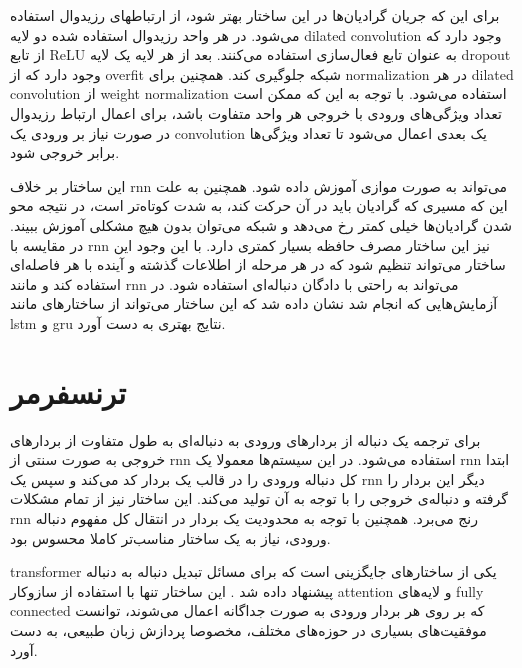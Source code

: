 برای این که جریان گرادیان‌ها در این ساختار بهتر شود، از ارتباطهای رزیدوال
استفاده می‌شود. در هر واحد رزیدوال استفاده شده دو لایه \gls{dilated convolution}
وجود دارد که از تابع ReLU به عنوان تابع فعال‌سازی استفاده می‌کنند. بعد از هر
لایه یک لایه dropout وجود دارد که از \gls{overfit} شبکه جلوگیری کند. همچنین برای
\gls{normalization} در هر \gls{dilated convolution} از \gls{weight
normalization} استفاده می‌شود. با توجه به این که ممکن است تعداد ویژگی‌های ورودی
با خروجی هر واحد متفاوت باشد، برای اعمال ارتباط رزیدوال در صورت نیاز بر ورودی یک
\gls{convolution} یک بعدی اعمال می‌شود تا تعداد ویژگی‌ها برابر خروجی شود.

این ساختار بر خلاف \gls{rnn} می‌تواند به صورت موازی آموزش داده شود. همچنین به
علت این که مسیری که گرادیان باید در آن حرکت کند، به شدت کوتاه‌تر است، در نتیجه
محو شدن گرادیان‌ها خیلی کمتر رخ می‌دهد و شبکه می‌توان بدون هیچ مشکلی آموزش
ببیند. در مقایسه با \gls{rnn} نیز این ساختار مصرف حافظه بسیار کمتری دارد. با این
وجود این ساختار می‌تواند تنظیم شود که در هر مرحله از اطلاعات گذشته و آینده با هر
فاصله‌ای استفاده کند و مانند \gls{rnn} می‌تواند به راحتی با دادگان دنباله‌ای
استفاده شود. در آزمایش‌هایی که انجام شد \cite{bai2018empirical} نشان داده شد که
این ساختار می‌تواند از ساختارهای مانند \gls{lstm} و \gls{gru} نتایج بهتری به دست
آورد.

\section{ترنسفرمر}
برای ترجمه یک دنباله از بردارهای ورودی به دنباله‌ای به طول متفاوت از بردارهای
خروجی به صورت سنتی از \gls{rnn} استفاده می‌شود. در این سیستم‌ها معمولا یک
\gls{rnn} ابتدا کل دنباله ورودی را در قالب یک بردار کد می‌کند و سپس یک \gls{rnn}
دیگر این بردار را گرفته و دنباله‌ی خروجی را با توجه به آن تولید می‌کند. این
ساختار نیز از تمام مشکلات \gls{rnn} رنج می‌برد. همچنین با توجه به محدودیت یک
بردار در انتقال کل مفهوم دنباله ورودی، نیاز به یک ساختار مناسب‌تر کاملا محسوس
بود.

\gls{transformer} یکی از ساختارهای جایگزینی است که برای مسائل تبدیل دنباله به
دنباله پیشنهاد داده شد \cite{vaswani2017attention}. این ساختار تنها با استفاده
از سازوکار \gls{attention} و لایه‌های \gls{fully connected} که بر روی هر بردار
ورودی به صورت جداگانه اعمال می‌شوند، توانست موفقیت‌های بسیاری در حوزه‌های مختلف،
مخصوصا پردازش زبان طبیعی، به دست آورد.

